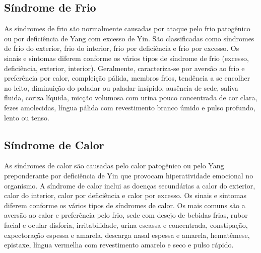 \documentclass[12pt,oneside,a4paper]{book} %
\begin{document}
\subsection{Síndrome de Frio}
As síndromes de frio são normalmente causadas por ataque pelo frio patogênico ou por deficiência de Yang com excesso de Yin. São classificadas como síndromes de frio do exterior, frio do interior, frio por deficiência e frio por excesso. 
Os sinais e sintomas diferem conforme os vários tipos de síndrome de frio (excesso, deficiência, exterior, interior). Geralmente, caracteriza-se por aversão ao frio e preferência por calor, compleição pálida, membros frios, tendência a se encolher no leito, diminuição do paladar ou paladar insípido, ausência de sede, saliva fluida, coriza líquida, micção volumosa com urina pouco concentrada de cor clara, fezes amolecidas, língua pálida com revestimento branco úmido e pulso profundo, lento ou tenso.
\subsection{Síndrome de Calor}
As síndromes de calor são causadas pelo calor patogênico ou pelo Yang preponderante por deficiência de Yin que provocam hiperatividade emocional no organismo. A síndrome de calor inclui as doenças secundárias a calor do exterior, calor do interior, calor por deficiência e calor por excesso. Os sinais e sintomas diferem conforme os vários tipos de síndromes de calor. Os mais comuns são a aversão ao calor e preferência pelo frio, sede com desejo de bebidas frias, rubor facial e ocular disforia, irritabilidade, urina escassa e concentrada, constipação, expectoração espessa e amarela, descarga nasal espessa e amarela, hematêmese, epistaxe, língua vermelha com revestimento amarelo e seco e pulso rápido.
\end{document}
